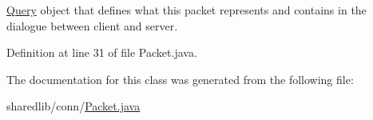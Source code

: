 \hyperlink{enumsharedlib_1_1conn_1_1_query}{Query} object that defines what this packet represents and contains in the dialogue between client and server. 

Definition at line 31 of file Packet.\+java.



The documentation for this class was generated from the following file\+:\begin{DoxyCompactItemize}
\item 
sharedlib/conn/\hyperlink{_packet_8java}{Packet.\+java}\end{DoxyCompactItemize}
